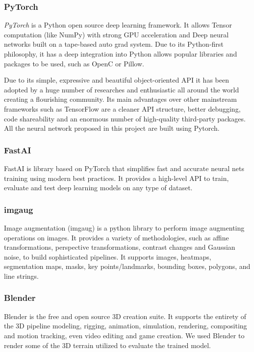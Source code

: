 \documentclass[../document.tex]{subfiles}
\begin{document}
\subsubsection{PyTorch}
\emph{PyTorch} is a Python open source deep learning framework. It allows Tensor computation (like NumPy) with strong GPU acceleration and Deep neural networks built on a tape-based auto grad system. Due to its Python-first philosophy, it has a deep integration into Python allows popular libraries and packages to be used, such as OpenC or Pillow.  

Due to its simple, expressive and beautiful object-oriented API it has been adopted by a huge number of researches and enthusiastic all around the world creating a flourishing community. 
Its main advantages over other mainstream frameworks such as TensorFlow \cite{tensorflow} are a cleaner API structure, better debugging, code shareability and an enormous number of high-quality third-party packages. All the neural network proposed in this project are built using Pytorch.

\subsubsection{FastAI}
FastAI is library based on PyTorch that simplifies fast and accurate neural nets training using modern best practices. It provides a high-level API to train, evaluate and test deep learning models on any type of dataset.

\subsubsection{imgaug}
Image augmentation (imgaug) is a python library to perform image augmenting operations on images. It provides a variety of methodologies, such as affine transformations, perspective transformations, contrast changes and Gaussian noise, to build sophisticated pipelines. It supports images,  heatmaps, segmentation maps, masks, key points/landmarks, bounding boxes, polygons, and line strings.

\subsubsection{Blender}
Blender is the free and open source 3D creation suite. It supports the entirety of the 3D pipeline modeling, rigging, animation, simulation, rendering, compositing and motion tracking, even video editing and game creation. We used Blender to render some of the 3D terrain utilized to evaluate the trained model.
\end{document}
